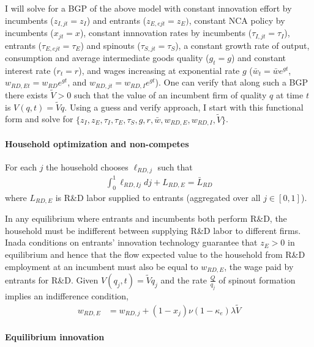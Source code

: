 \documentclass[11pt,english]{article}
\theoremstyle{remark}
\begin{document}
I will solve for a BGP of the above model with constant innovation effort by incumbents ($z_{I,jt} = z_I$) and entrants ($z_{E,ejt} = z_{E})$, constant NCA policy by incumbents ($x_{jt} = x$), constant innnovation rates by incumbents ($\tau_{I,jt} = \tau_I$), entrants ($\tau_{E,ejt} = \tau_E$) and spinouts ($\tau_{S,jt} = \tau_S$), a constant growth rate of output, consumption and average intermediate goods quality ($g_t = g$) and constant interest rate ($r_t = r$), and wages increasing at exponential rate $g$ ($\bar{w}_t = \bar{w} e^{gt}$, $w_{RD,Et} = w_{RD}e^{gt}$, and $w_{RD,jt} = w_{RD,I}e^{gt}$). One can verify that along such a BGP there exists $\tilde{V} > 0$ such that the value of an incumbent firm of quality $q$ at time $t$ is $V(q,t) = \tilde{V}q$. Using a guess and verify approach, I start with this functional form and solve for $\{z_I,z_E,\tau_I,\tau_E,\tau_S,g,r,\bar{w},w_{RD,E},w_{RD,I},\tilde{V}\}$. 

\paragraph{Household optimization and non-competes}

For each $j$ the household chooses $\ell_{RD,j}$ such that
\begin{align}
\int_0^1 \ell_{RD,Ij} dj + L_{RD,E} = \bar{L}_{RD}
\end{align}
where $L_{RD,E}$ is R\&D labor supplied to entrants (aggregated over all $j \in [0,1]$).

In any equilibrium where entrants and incumbents both perform R\&D, the household must be indifferent between supplying R\&D labor to different firms. Inada conditions on entrants' innovation technology guarantee that $z_E > 0$ in equilibrium and hence that the flow expected value to the household from R\&D employment at an incumbent must also be equal to $w_{RD,E}$, the wage paid by entrants for R\&D. Given $V(q_j,t) = \tilde{V}q_j$ and the rate $\frac{Q}{q_j}$ of spinout formation implies an indifference condition, 
\begin{align}
	w_{RD,E} &= w_{RD,j} + (1-x_j) \nu (1-\kappa_e) \lambda \tilde{V} \label{eq:RD_worker_indifference}
\end{align}

\paragraph{Equilibrium innovation}
\end{document}
